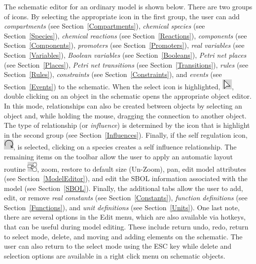 \documentclass[titlepage,11pt]{article}
\begin{document}
The schematic editor for an ordinary model is shown below.  There are two groups of icons.  By selecting the appropriate icon in the first group, the user can add \emph{compartments} (see Section~\ref{Compartments}), \emph{chemical species} (see Section~\ref{Species}), 
\emph{chemical reactions} (see Section~\ref{Reactions}), \emph{components} (see Section~\ref{Components}), \emph{promoters} (see Section~\ref{Promoters}), \emph{real variables} (see Section~\ref{Variables}), \emph{Boolean variables} (see Section~\ref{Booleans}), \emph{Petri net places} (see Section~\ref{Places}), \emph{Petri net transitions} (see Section~\ref{Transitions}), \emph{rules} (see Section~\ref{Rules}), \emph{constraints} (see Section~\ref{Constraints}), and \emph{events} (see Section~\ref{Events}) to the schematic.  When the select icon is highlighted, \includegraphics{../gui/icons/modelview/select_mode_selected}, double clicking on an object in the schematic opens the appropriate object editor.  In this mode, relationships can also be created between objects by selecting an object and, while holding the mouse, dragging the connection to another object.  The type of relationship (or \emph{influence}) is determined by the icon that is highlight in the second group  (see Section~\ref{Influences}).  Finally, if the self regulation icon,
\includegraphics{../gui/icons/modelview/self_influence_selected}, is selected, clicking on a species creates a self influence relationship.  The remaining items on the toolbar allow the user to apply an automatic layout routine \includegraphics{../gui/icons/modelview/choose_layout_selected}, zoom, restore to default size (Un-Zoom), pan, edit model attributes (see Section~\ref{ModelEditor}), and edit the SBOL information associated with the model (see Section~\ref{SBOL}).  Finally, the additional tabs allow the user to add, edit, or remove \emph{real constants} (see Section~\ref{Constants}), \emph{function definitions} (see Section~\ref{Functions}), and \emph{unit definitions} (see Section~\ref{Units}).  One last note, there are several options in the Edit menu, which are also available via hotkeys, that can be useful during model editing.  These include return undo, redo, return to select mode, delete, and moving and adding elements on the schematic.  The user can also return to the select mode using the ESC key while delete and selection options are available in a right click menu on schematic objects.  
\end{document}
